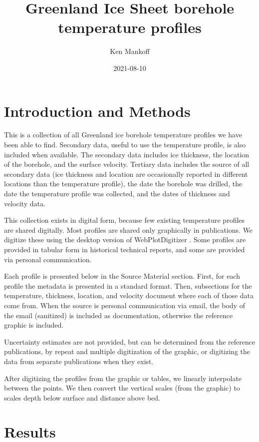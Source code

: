 \documentclass[article,a4paper,times,11pt,twoside]{article}
\author{Ken Mankoff}
\date{2021-08-10}
\title{Greenland Ice Sheet borehole temperature profiles}
\begin{document}
\maketitle
\setcounter{tocdepth}{2}
\tableofcontents


\clearpage
\section{Introduction and Methods}
\label{sec:org71d52f3}
This is a collection of all Greenland ice borehole temperature profiles we have been able to find. Secondary data, useful to use the temperature profile, is also included when available. The secondary data includes ice thickness, the location of the borehole, and the surface velocity. Tertiary data includes the source of all secondary data (ice thickness and location are occasionally reported in different locations than the temperature profile), the date the borehole was drilled, the date the temperature profile was collected, and the dates of thickness and velocity data.

This collection exists in digital form, because few existing temperature profiles are shared digitally. Most profiles are shared only graphically in publications. We digitize these using the desktop version of WebPlotDigitizer \autocite{WPD}. Some profiles are provided in tabular form in historical technical reports, and some are provided via personal communication.

Each profile is presented below in the Source Material section. First, for each profile the metadata is presented in a standard format. Then, subsections for the temperature, thickness, location, and velocity document where each of those data come from. When the source is personal communication via email, the body of the email (sanitized) is included as documentation, otherwise the reference graphic is included.

Uncertainty estimates are not provided, but can be determined from the reference publications, by repeat and multiple digitization of the graphic, or digitizing the data from separate publications when they exist.

After digitizing the profiles from the graphic or tables, we linearly interpolate between the points. We then convert the vertical scales (from the graphic) to scales depth below surface and distance above bed.

\section{Results}
\label{sec:orgd07c2bb}
\end{document}
